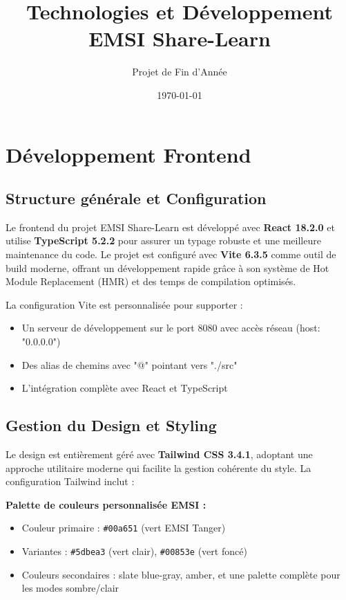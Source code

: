 \documentclass[12pt,a4paper]{article}
\title{\textbf{Technologies et Développement\\EMSI Share-Learn}}
\author{Projet de Fin d'Année}
\date{\today}
\begin{document}
\maketitle
\tableofcontents
\newpage

\section{Développement Frontend}

\subsection{Structure générale et Configuration}

Le frontend du projet EMSI Share-Learn est développé avec \textbf{React 18.2.0} et utilise \textbf{TypeScript 5.2.2} pour assurer un typage robuste et une meilleure maintenance du code. Le projet est configuré avec \textbf{Vite 6.3.5} comme outil de build moderne, offrant un développement rapide grâce à son système de Hot Module Replacement (HMR) et des temps de compilation optimisés.

La configuration Vite est personnalisée pour supporter :
\begin{itemize}
    \item Un serveur de développement sur le port 8080 avec accès réseau (host: "0.0.0.0")
    \item Des alias de chemins avec "@" pointant vers "./src"
    \item L'intégration complète avec React et TypeScript
\end{itemize}

\subsection{Gestion du Design et Styling}

Le design est entièrement géré avec \textbf{Tailwind CSS 3.4.1}, adoptant une approche utilitaire moderne qui facilite la gestion cohérente du style. La configuration Tailwind inclut :

\textbf{Palette de couleurs personnalisée EMSI :}
\begin{itemize}
    \item Couleur primaire : \texttt{\#00a651} (vert EMSI Tanger)
    \item Variantes : \texttt{\#5dbea3} (vert clair), \texttt{\#00853e} (vert foncé)
    \item Couleurs secondaires : slate blue-gray, amber, et une palette complète pour les modes sombre/clair
\end{itemize}
\end{document}
